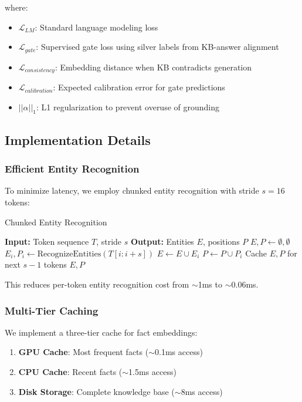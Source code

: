 \documentclass[11pt, a4paper]{article}
\theoremstyle{definition}
\begin{document}
where:
\begin{itemize}
    \item $\mathcal{L}_{LM}$: Standard language modeling loss
    \item $\mathcal{L}_{gate}$: Supervised gate loss using silver labels from KB-answer alignment
    \item $\mathcal{L}_{consistency}$: Embedding distance when KB contradicts generation
    \item $\mathcal{L}_{calibration}$: Expected calibration error for gate predictions
    \item $||\alpha||_1$: L1 regularization to prevent overuse of grounding
\end{itemize}

\subsection{Implementation Details}

\subsubsection{Efficient Entity Recognition}

To minimize latency, we employ chunked entity recognition with stride $s=16$ tokens:

\begin{algorithm}
\caption{Chunked Entity Recognition}
\begin{algorithmic}
\STATE \textbf{Input:} Token sequence $T$, stride $s$
\STATE \textbf{Output:} Entities $E$, positions $P$
\STATE $E, P \leftarrow \emptyset, \emptyset$
    \STATE $E_i, P_i \leftarrow \text{RecognizeEntities}(T[i:i+s])$
    \STATE $E \leftarrow E \cup E_i$
    \STATE $P \leftarrow P \cup P_i$
\ENDFOR
\STATE Cache $E, P$ for next $s-1$ tokens
\RETURN $E, P$
\end{algorithmic}
\end{algorithm}

This reduces per-token entity recognition cost from $\sim$1ms to $\sim$0.06ms.

\subsubsection{Multi-Tier Caching}

We implement a three-tier cache for fact embeddings:
\begin{enumerate}
    \item \textbf{GPU Cache}: Most frequent facts ($\sim$0.1ms access)
    \item \textbf{CPU Cache}: Recent facts ($\sim$1.5ms access)  
    \item \textbf{Disk Storage}: Complete knowledge base ($\sim$8ms access)
\end{enumerate}
\end{document}
